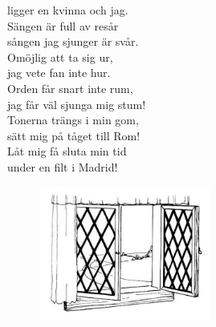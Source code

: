 \documentclass[a6paper,10pt]{article}
\begin{document}
\begin{lyrics}
ligger en kvinna och jag.\\ 
Sängen är full av resår\\ 
sången jag sjunger är svår.
\vspace{5pt}\\  
Omöjlig att ta sig ur,\\ 
jag vete fan inte hur.\\ 
Orden får snart inte rum,\\ 
jag får väl sjunga mig stum!
\vspace{5pt}\\  
Tonerna trängs i min gom,\\ 
sätt mig på tåget till Rom!\\ 
Låt mig få sluta min tid\\ 
under en filt i Madrid! 
\end{lyrics}
\vspace{25pt}
\begin{figure}[!h]
\center
\includegraphics[width=0.5\textwidth]{fonster.png}
\end{figure}
\end{document}
